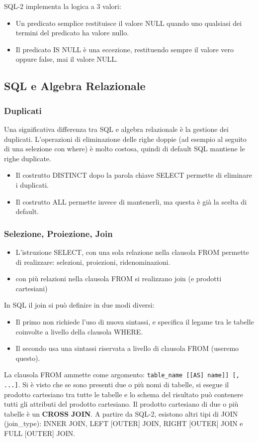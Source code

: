 \documentclass[a4paper]{article}
\begin{document}
SQL-2 implementa la logica a 3 valori:
\begin{itemize}
    \item Un predicato semplice restituisce il valore NULL quando uno qualsiasi dei termini del
    predicato ha valore nullo.
    \item Il predicato IS NULL è una eccezione, restituendo sempre il valore vero oppure false, mai
    il valore NULL.
\end{itemize}

\subsection{SQL e Algebra Relazionale}

\subsubsection{Duplicati}

Una significativa differenza tra SQL e algebra relazionale è la gestione dei duplicati.
L’operazioni di eliminazione delle righe doppie
(ad esempio al seguito di una selezione con where) è molto costosa, quindi di default SQL
mantiene le righe duplicate.

\begin{itemize}
    \item Il costrutto DISTINCT dopo la parola chiave SELECT permette di
    eliminare i duplicati.
    \item Il costrutto ALL permette invece di mantenerli, ma questa è già la scelta di default.
\end{itemize}

\subsubsection{Selezione, Proiezione, Join}

\begin{itemize}
    \item L’istruzione SELECT, con una sola relazione nella clausola FROM
    permette di realizzare: selezioni, proiezioni, ridenominazioni.
    \item con più relazioni nella clausola FROM si realizzano join (e prodotti
cartesiani)
\end{itemize}
\noindent
In SQL il join si può definire in due modi diversi:
\begin{itemize}
    \item Il primo non richiede l’uso di nuova sintassi, e specifica il legame
    tra le tabelle coinvolte a livello della clausola WHERE.
    \item Il secondo usa una sintassi riservata a livello di clausola FROM
    (useremo questo).
\end{itemize}
La clausola FROM ammette come argomento: \texttt{table\_name [[AS] name]] [, ...]}.
Si è visto che se sono presenti due o più nomi di tabelle, si esegue
il prodotto cartesiano tra tutte le tabelle e lo schema del risultato
può contenere tutti gli attributi del prodotto cartesiano.
Il prodotto cartesiano di due o più tabelle è un \textbf{CROSS JOIN}.
A partire da SQL-2, esistono altri tipi di JOIN (join\_type):
INNER JOIN, LEFT [OUTER] JOIN, RIGHT [OUTER] JOIN e FULL
[OUTER] JOIN.
\end{document}
